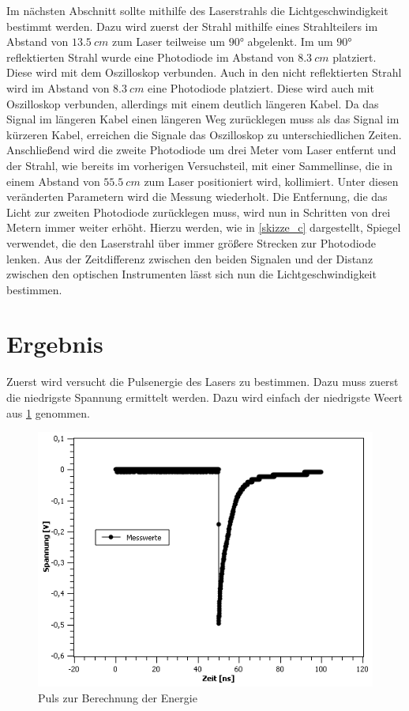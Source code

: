 \documentclass[
	a4paper,
	12pt,
	pagesize,
	ngerman
]{scrartcl}
\begin{document}
Im nächsten Abschnitt sollte mithilfe des Laserstrahls die Lichtgeschwindigkeit bestimmt werden. Dazu wird zuerst der Strahl mithilfe eines Strahlteilers im Abstand von $\SI{13,5}{cm}$ zum Laser teilweise um $90$° abgelenkt. Im um $90$° reflektierten Strahl wurde eine Photodiode im Abstand von $\SI{8,3}{cm}$ platziert. Diese wird mit dem Oszilloskop verbunden. Auch in den nicht reflektierten Strahl wird im Abstand von $\SI{8,3}{cm}$ eine Photodiode platziert. Diese wird auch mit Oszilloskop verbunden, allerdings mit einem deutlich längeren Kabel. Da das Signal im längeren Kabel einen längeren Weg zurücklegen muss als das Signal im kürzeren Kabel, erreichen die Signale das Oszilloskop zu unterschiedlichen Zeiten.
Anschließend wird die zweite Photodiode um drei Meter vom Laser entfernt und der Strahl, wie bereits im vorherigen Versuchsteil, mit einer Sammellinse, die in einem Abstand von $\SI{55,5}{cm}$ zum Laser positioniert wird, kollimiert. Unter diesen veränderten Parametern wird die Messung wiederholt. Die Entfernung, die das Licht zur zweiten Photodiode zurücklegen muss, wird nun in Schritten von drei Metern immer weiter erhöht. Hierzu werden, wie in \cref{skizze_c} dargestellt, Spiegel verwendet, die den Laserstrahl über immer größere Strecken zur Photodiode lenken.
Aus der Zeitdifferenz zwischen den beiden Signalen und der Distanz zwischen den optischen Instrumenten lässt sich nun die Lichtgeschwindigkeit bestimmen.

\section{Ergebnis}
Zuerst wird versucht die Pulsenergie des Lasers zu bestimmen. Dazu muss zuerst die niedrigste Spannung ermittelt werden. Dazu wird einfach der niedrigste Weert aus \cref{Energie} genommen. 

\begin{figure}[h!]
	\centering
	\includegraphics[scale=0.7]{Energie.png}
	\caption{Puls zur Berechnung der Energie}
	\label{Energie}
\end{figure}
\end{document}
